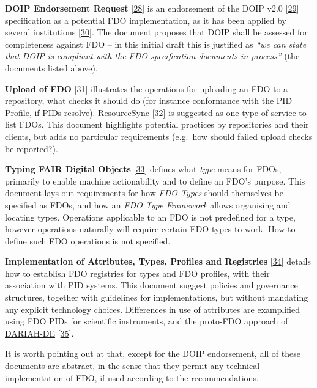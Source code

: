 \textbf{DOIP Endorsement Request} {[}\protect\hyperlink{ref-15yGpJ0wh}{28}{]} is an endorsement of the DOIP v2.0 {[}\protect\hyperlink{ref-13TcbsZF6}{29}{]} specification as a potential FDO implementation, as it has been applied by several institutions {[}\protect\hyperlink{ref-jRWurmQc}{30}{]}. The document proposes that DOIP shall be assessed for completeness against FDO -- in this initial draft this is justified as \emph{``we can state that DOIP is compliant with the FDO specification documents in process''} (the documents listed above).

\textbf{Upload of FDO} {[}\protect\hyperlink{ref-1H7cmmr69}{31}{]} illustrates the operations for uploading an FDO to a repository, what checks it should do (for instance conformance with the PID Profile, if PIDs resolve). ResourceSync {[}\protect\hyperlink{ref-eS5y9TRh}{32}{]} is suggested as one type of service to list FDOs. This document highlights potential practices by repositories and their clients, but adds no particular requirements (e.g.~how should failed upload checks be reported?).

\textbf{Typing FAIR Digital Objects} {[}\protect\hyperlink{ref-ZFzPxCNB}{33}{]} defines what \emph{type} means for FDOs, primarily to enable machine actionability and to define an FDO's purpose. This document lays out requirements for how \emph{FDO Types} should themselves be specified as FDOs, and how an \emph{FDO Type Framework} allows organising and locating types. Operations applicable to an FDO is not predefined for a type, however operations naturally will require certain FDO types to work. How to define such FDO operations is not specified.

\textbf{Implementation of Attributes, Types, Profiles and Registries} {[}\protect\hyperlink{ref-126uxr5pI}{34}{]} details how to establish FDO registries for types and FDO profiles, with their association with PID systems. This document suggest policies and governance structures, together with guidelines for implementations, but without mandating any explicit technology choices. Differences in use of attributes are examplified using FDO PIDs for scientific instruments, and the proto-FDO approach of \href{https://de.dariah.eu/}{DARIAH-DE} {[}\protect\hyperlink{ref-1CqIZ47pu}{35}{]}.

It is worth pointing out at that, except for the DOIP endorsement, all of these documents are abstract, in the sense that they permit any technical implementation of FDO, if used according to the recommendations.

